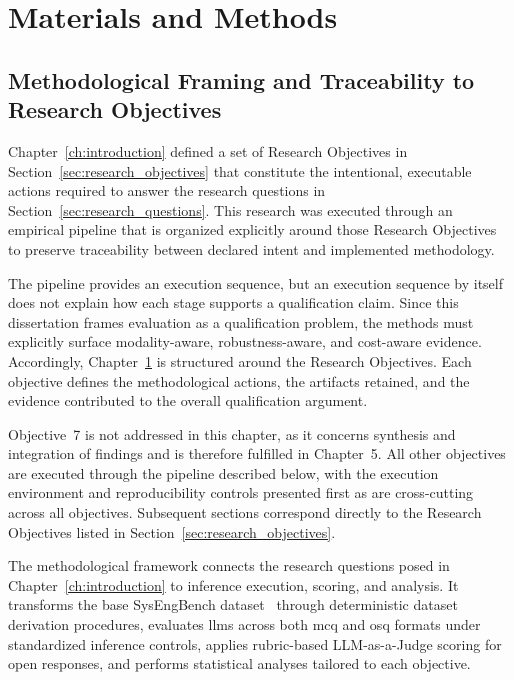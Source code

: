 \chapter{Materials and Methods}\label{ch:materials_methods}

\section{Methodological Framing and Traceability to Research Objectives}
\label{sec:ch3_framing}

Chapter~\ref{ch:introduction} defined a set of Research Objectives in Section~\ref{sec:research_objectives} that constitute the intentional, executable actions required to answer the research questions in Section~\ref{sec:research_questions}. This research was executed through an empirical pipeline that is organized explicitly around those Research Objectives to preserve traceability between declared intent and implemented methodology.

The pipeline provides an execution sequence, but an execution sequence by itself does not explain how each stage supports a qualification claim. Since this dissertation frames evaluation as a qualification problem, the methods must explicitly surface modality-aware, robustness-aware, and cost-aware evidence. Accordingly, Chapter~\ref{ch:materials_methods} is structured around the Research Objectives. Each objective defines the methodological actions, the artifacts retained, and the evidence contributed to the overall qualification argument. 

Objective~7 is not addressed in this chapter, as it concerns synthesis and integration of findings and is therefore fulfilled in Chapter~5. All other objectives are executed through the pipeline described below, with the execution environment and reproducibility controls presented first as are cross-cutting across all objectives. Subsequent sections correspond directly to the Research Objectives listed in Section~\ref{sec:research_objectives}. 

The methodological framework connects the research questions posed in Chapter~\ref{ch:introduction} to inference execution, scoring, and analysis. It transforms the base SysEngBench dataset~\cite{bell_RabellSysEngBenchDatasets_2024} through deterministic dataset derivation procedures, evaluates \acp{llm} across both \ac{mcq} and \ac{osq} formats under standardized inference controls, applies rubric-based LLM-as-a-Judge scoring for open responses, and performs statistical analyses tailored to each objective.

